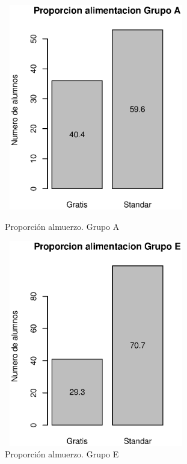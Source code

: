 \documentclass{article}
\begin{document}
    
    \begin{figure}[H]
        \begin{minipage}[b]{0.45\linewidth}
            \includegraphics[width=8cm,height = 9cm]{Output/Plots/figura13.eps}
            \vspace*{-15mm}
            \caption{Proporci\'on almuerzo. Grupo A}
            \label{fig:minipage1}
        \end{minipage}
        \hspace{0.2cm}
        \begin{minipage}[b]{0.45\linewidth}
            \includegraphics[width=8cm,height = 9cm]{Output/Plots/figura14.eps}
            \vspace*{-15mm}
            \caption{Proporci\'on almuerzo. Grupo E}
            \label{fig:minipage2}
        \end{minipage}
    \end{figure}
\end{document}
